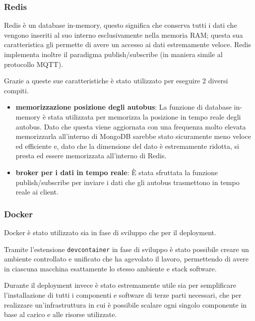 \subsubsection{Redis}

Redis è un database in-memory, questo significa che conserva tutti i dati che vengono inseriti al suo interno esclusivamente nella memoria RAM; questa sua caratteristica gli permette di avere un accesso ai dati estremamente veloce. Redis implementa inoltre il paradigma publish/subscribe (in maniera simile al protocollo MQTT).

Grazie a queste sue caratteristiche è stato utilizzato per eseguire 2 diversi compiti.
\begin{itemize}
    \item \textbf{memorizzazione posizione degli autobus}:  La funzione di database in-memory è stata utilizzata per memorizza la posizione in tempo reale degli autobus. Dato che questa viene aggiornata con una frequenza molto elevata memorizzarla all'interno di MongoDB sarebbe stato sicuramente meno veloce ed efficiente e, dato che la dimensione del dato è estremamente ridotta, si presta ed essere memorizzata all'interno di Redis.
    \item \textbf{broker per i dati in tempo reale}: È stata sfruttata la funzione publish/subscribe per inviare i dati che gli autobus trasmettono in tempo reale ai client.
\end{itemize}

\subsubsection{Docker}

Docker è stato utilizzato sia in fase di sviluppo che per il deployment.

Tramite l'estensione \verb|devcontainer| in fase di sviluppo è stato possibile creare un ambiente controllato e unificato che ha agevolato il lavoro, permettendo di avere in ciascuna macchina esattamente lo stesso ambiente e stack software.

Durante il deployment invece è stato estremamente utile sia per semplificare l'installazione di tutti i componenti e software di terze parti necessari, che per realizzare un'infrastruttura in cui è possibile scalare ogni singolo componente in base al carico e alle risorse utilizzate.
